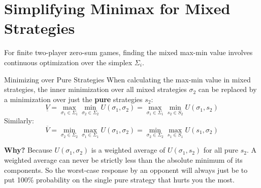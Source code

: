 \documentclass[12pt, a4paper]{article}
\begin{document}
\section{Simplifying Minimax for Mixed Strategies}

For finite two-player zero-sum games, finding the mixed max-min value involves continuous optimization over the simplex $\Sigma_i$.

\begin{thmbox}{Minimizing over Pure Strategies}
  When calculating the max-min value in mixed strategies, the inner minimization over all mixed strategies $\sigma_2$ can be replaced by a minimization over just the \textbf{pure} strategies $s_2$:
  \[
    \underline{V} = \max_{\sigma_1 \in \Sigma_1} \min_{\sigma_2 \in \Sigma_2} U(\sigma_1, \sigma_2) = \max_{\sigma_1 \in \Sigma_1} \min_{s_2 \in S_2} U(\sigma_1, s_2)
  \]
  Similarly:
  \[
    \overline{V} = \min_{\sigma_2 \in \Sigma_2} \max_{\sigma_1 \in \Sigma_1} U(\sigma_1, \sigma_2) = \min_{\sigma_2 \in \Sigma_2} \max_{s_1 \in S_1} U(s_1, \sigma_2)
  \]
\end{thmbox}

\textbf{Why?} Because $U(\sigma_1, \sigma_2)$ is a weighted average of $U(\sigma_1, s_2)$ for all pure $s_2$. A weighted average can never be strictly less than the absolute minimum of its components. So the worst-case response by an opponent will always just be to put 100\% probability on the single pure strategy that hurts you the most.
\end{document}
